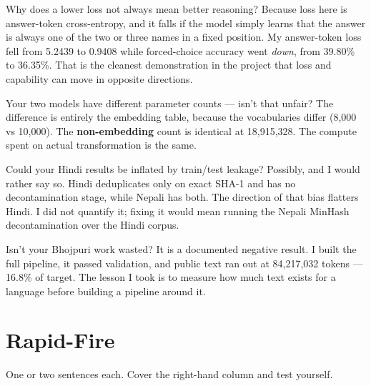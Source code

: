 \documentclass[11pt]{report}
\begin{document}
\begin{qabox}{Why does a lower loss not always mean better reasoning?}
Because loss here is answer-token cross-entropy, and it falls if the model
simply learns that the answer is always one of the two or three names in a
fixed position. My answer-token loss fell from 5.2439 to 0.9408 while
forced-choice accuracy went \emph{down}, from 39.80\% to 36.35\%. That is the
cleanest demonstration in the project that loss and capability can move in
opposite directions.
\end{qabox}

\begin{qabox}{Your two models have different parameter counts --- isn't that unfair?}
The difference is entirely the embedding table, because the vocabularies differ
(8,000 vs 10,000). The \textbf{non-embedding} count is identical at 18,915,328.
The compute spent on actual transformation is the same.
\end{qabox}

\begin{qabox}{Could your Hindi results be inflated by train/test leakage?}
Possibly, and I would rather say so. Hindi deduplicates only on exact SHA-1 and
has no decontamination stage, while Nepali has both. The direction of that bias
flatters Hindi. I did not quantify it; fixing it would mean running the Nepali
MinHash decontamination over the Hindi corpus.
\end{qabox}

\begin{qabox}{Isn't your Bhojpuri work wasted?}
It is a documented negative result. I built the full pipeline, it passed
validation, and public text ran out at 84,217,032 tokens --- 16.8\% of target.
The lesson I took is to measure how much text exists for a language before
building a pipeline around it.
\end{qabox}

\chapter{Rapid-Fire}

One or two sentences each. Cover the right-hand column and test yourself.
\end{document}

